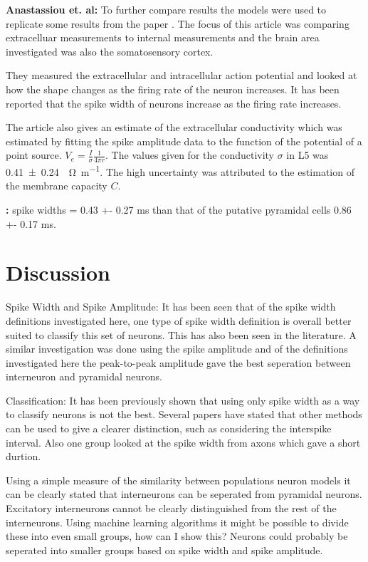\documentclass[altfont, fleqn]{uiophd}
\begin{document}
\noindent
{\bf Anastassiou et. al:}
To further compare results 
the models were used to replicate 
some results from the paper
\textcite{anastassiou_cell_2015}.
The focus of this article was 
comparing extracelluar measurements to internal measurements
and the brain area investigated was also the somatosensory cortex. 

They measured the extracellular and intracellular action potential
and looked at how the shape changes as the firing rate of the neuron 
increases. 
It has been reported that the spike width of neurons
increase as the firing rate increases. 

The article also gives an estimate of the extracellular conductivity
which was estimated by fitting the spike amplitude data to the 
function of the potential of a point source. 
$V_e = \frac{I}{\sigma} \frac{1}{4 \pi r}$. 
The values given for the conductivity $\sigma$ in L5 was 
\SI[separate-uncertainty = true]{0.41 \pm 0.24}{\per\ohm\per\metre}.
The high uncertainty was attributed to the estimation of 
the membrane capacity $C$.

\noindent
{\bf \Textcite{bartho_characterization_2004}:}
spike widths  = 0.43 +- 0.27 ms than that of the
putative pyramidal cells 0.86 +- 0.17 ms.
\newline

\chapter{Discussion}

Spike Width and Spike Amplitude:
It has been seen that of the spike width definitions investigated here, 
one type of spike width definition is overall
better suited to classify this set of neurons. 
This has also been seen in the literature. 
A similar investigation was done using the spike amplitude and of the
definitions investigated here the peak-to-peak amplitude gave the best
seperation between interneuron and pyramidal neurons. 

Classification:
It has been previously shown that using only spike width as 
a way to classify neurons is not the best. 
Several papers have stated that other methods can be used to give 
a clearer distinction, such as considering the interspike interval. 
Also one group looked at the spike width from axons which gave a short 
durtion. 

Using a simple measure of the similarity between populations
neuron models it can be clearly stated that interneurons can be seperated
from pyramidal neurons. 
Excitatory interneurons cannot be clearly distinguished from the rest of the
interneurons. 
Using machine learning algorithms it might be possible to divide these
into even small groups, how can I show this?
Neurons could probably be seperated into smaller groups based on
spike width and spike amplitude. 
\end{document}
